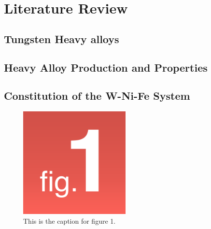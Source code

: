 
\chapter{Literature Review}

\label{Chapter2}


\section{Tungsten Heavy alloys}
\label{Tungsten Heavy alloys}

\lipsum[2-4]

\section{Heavy Alloy Production and Properties}
\label{Heavy Alloy Production and Properties}

\lipsum[2-4]


\section{Constitution of the W-Ni-Fe System}

\lipsum[2-4]

\begin{figure}
    \centering
    \includegraphics[width=0.5\textwidth]{Pictures/Figure 1.png}
    \caption{This is the caption for figure 1.}
    \label{figure:chap2_Figure_2}
\end{figure}




